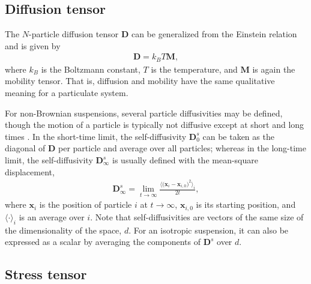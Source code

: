 \subsection{Diffusion tensor}

The $N$-particle diffusion tensor $\bm D$ can be generalized from the Einstein relation \citep{Einstein1905} and is given by
\begin{equation}
 \begin{aligned}
   {\bm D} = k_BT{\bm M},
 \end{aligned}
\end{equation}
where $k_B$ is the Boltzmann constant, $T$ is the temperature, and ${\bm M}$ is again the mobility tensor. That is, diffusion and mobility have the same qualitative meaning for a particulate system.

For non-Brownian suspensions, several particle diffusivities may be defined, though the motion of a particle is typically not diffusive except at short and long times \citep{Brady_Bossis1988}.
In the short-time limit, the self-diffusivity ${\bm D}_0^s$ can be taken as the diagonal of $\bm{D}$ per particle and average over all particles; whereas in the long-time limit, the self-diffusivity ${\bm D}_\infty^s$ is usually defined with the mean-square displacement, \viz
\begin{equation}
 \begin{aligned}
   {\bm D}_\infty^s = \lim_{t \to \infty} \frac{ \langle \big({\bm x}_i - {\bm x}_{i,0} )^2 \rangle_i }{2t},
 \end{aligned}
\end{equation}
where ${\bm x}_i$ is the position of particle $i$ at $t \to \infty$, ${\bm x}_{i,0}$ is its starting position, and $\langle \cdot \rangle_i$ is an average over $i$. Note that self-diffusivities are vectors of the same size of the dimensionality of the space, $d$. For an isotropic suspension, it can also be expressed as a scalar by averaging the components of ${\bm D}^s$ over $d$.

\subsection{Stress tensor}

